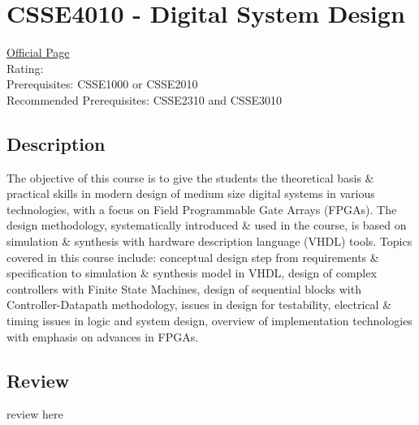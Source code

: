 \hypertarget{CSSE4010}{\section{CSSE4010 - Digital System Design}}

\large
\textcolor{turbo_purple}{\href{https://my.uq.edu.au/programs-courses/course.html?course_code=CSSE4010}{Official Page}} \\
Rating: \cstar\cstar\cstar\cstar\ostar \\
Prerequisites: CSSE1000 or CSSE2010 \\
Recommended Prerequisites: CSSE2310 and CSSE3010

\normalsize
\subsection*{Description}
The objective of this course is to give the students the theoretical basis \& practical skills in modern design of medium size digital systems in various technologies, with a focus on Field Programmable Gate Arrays (FPGAs).
The design methodology, systematically introduced \& used in the course, is based on simulation \& synthesis with hardware description language (VHDL) tools.
Topics covered in this course include: conceptual design step from requirements \& specification to simulation \& synthesis model in VHDL, design of complex controllers with Finite State Machines, design of sequential blocks with Controller-Datapath methodology, issues in design for testability, electrical \& timing issues in logic and system design, overview of implementation technologies with emphasis on advances in FPGAs.

\subsection*{Review}
review here

